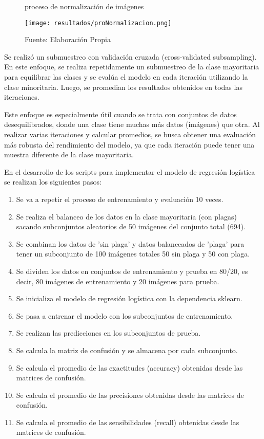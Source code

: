 \begin{figure}[h]
\centering
\caption{proceso de normalización de imágenes}
\texttt{[image: resultados/proNormalizacion.png]}
\caption*{\footnotesize Fuente: Elaboración Propia}
\label{fig:figuraProNormalizacion}
\end{figure}

Se realizó un submuestreo con validación cruzada (cross-validated subsampling). En este enfoque, se realiza repetidamente un submuestreo de la clase mayoritaria para equilibrar las clases y se evalúa el modelo en cada iteración utilizando la clase minoritaria. Luego, se promedian los resultados obtenidos en todas las iteraciones.

Este enfoque es especialmente útil cuando se trata con conjuntos de datos desequilibrados, donde una clase tiene muchas más datos (imágenes) que otra. Al realizar varias iteraciones y calcular promedios, se busca obtener una evaluación más robusta del rendimiento del modelo, ya que cada iteración puede tener una muestra diferente de la clase mayoritaria.

En el desarrollo de los scripts para implementar el modelo de regresión logística se realizan los siguientes pasos:

\newpage

\begin{enumerate}
    \item Se va a repetir el proceso de entrenamiento y evaluación 10 veces.
    \item Se realiza el balanceo de los datos en la clase mayoritaria (con plagas) sacando subconjuntos aleatorios de 50 imágenes del conjunto total (694).
    \item Se combinan los datos de 'sin plaga' y datos balanceados de 'plaga’ para tener un subconjunto de 100 imágenes totales 50 sin plaga y 50 con plaga.
    \item Se dividen los datos en conjuntos de entrenamiento y prueba en 80/20, es decir, 80 imágenes de entrenamiento y 20 imágenes para prueba.
    \item Se inicializa el modelo de regresión logística con la dependencia sklearn.
    \item Se pasa a entrenar el modelo con los subconjuntos de entrenamiento.
    \item Se realizan las predicciones en los subconjuntos de prueba.
    \item Se calcula la matriz de confusión y se almacena por cada subconjunto.
    \item Se calcula el promedio de las exactitudes (accuracy) obtenidas desde las matrices de confusión.
    \item Se calcula el promedio de las precisiones obtenidas desde las matrices de confusión.
    \item Se calcula el promedio de las sensibilidades (recall) obtenidas desde las matrices de confusión.
\end{enumerate}

